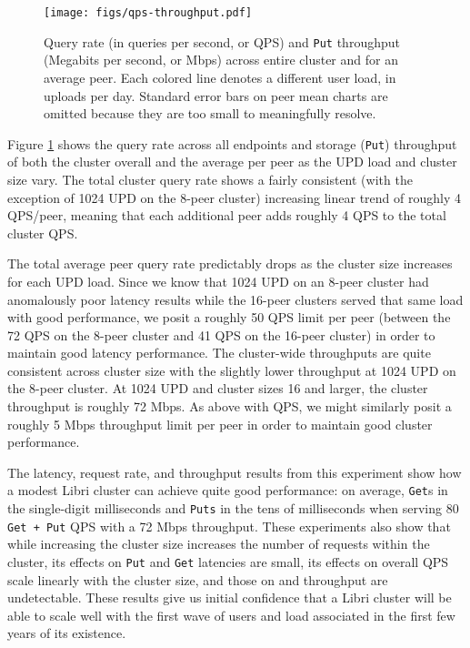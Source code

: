 \documentclass[10pt]{article}
\newcommand{\ttt}[1]{\texttt{#1}}
\def\Put{\ttt{Put}}
\begin{document}
\begin{figure}[t]
	\centering
	\texttt{[image: figs/qps-throughput.pdf]}
	\caption{Query rate (in queries per second, or QPS) and \Put{} throughput (Megabits per second, or Mbps) across entire cluster and for an average peer. Each colored line denotes a different user load, in uploads per day. Standard error bars on peer mean charts are omitted because they are too small to meaningfully resolve.}
	\label{fig:ratethroughput}
\end{figure}

Figure \ref{fig:ratethroughput} shows the query rate across all endpoints and storage (\Put{}) throughput of both the cluster overall and the average per peer as the UPD load and cluster size vary. The total cluster query rate shows a fairly consistent (with the exception of 1024 UPD on the 8-peer cluster) increasing linear trend of roughly 4 QPS/peer, meaning that each additional peer adds roughly 4 QPS to the total cluster QPS.

The total average peer query rate predictably drops as the cluster size increases for each UPD load. Since we know that 1024 UPD on an 8-peer cluster had anomalously poor latency results while the 16-peer clusters served that same load with good performance, we posit a roughly 50 QPS limit per peer (between the 72 QPS on the 8-peer cluster and 41 QPS on the 16-peer cluster) in order to maintain good latency performance. The cluster-wide throughputs are quite consistent across cluster size with the slightly lower throughput at 1024 UPD on the 8-peer cluster. At 1024 UPD and cluster sizes 16 and larger, the cluster throughput is roughly 72 Mbps. As above with QPS, we might similarly posit a roughly 5 Mbps throughput limit per peer in order to maintain good cluster performance.

The latency, request rate, and throughput results from this experiment show how a modest Libri cluster can achieve quite good performance: on average, \ttt{Get}s in the single-digit milliseconds and \texttt{Puts} in the tens of milliseconds when serving 80 \texttt{Get + Put} QPS with a 72 Mbps throughput. These experiments also show that while increasing the cluster size increases the number of requests within the cluster, its effects on \texttt{Put} and \texttt{Get} latencies are small, its effects on overall QPS scale linearly with the cluster size, and those on and throughput are undetectable. These results give us initial confidence that a Libri cluster will be able to scale well with the first wave of users and load associated in the first few years of its existence.
\end{document}
